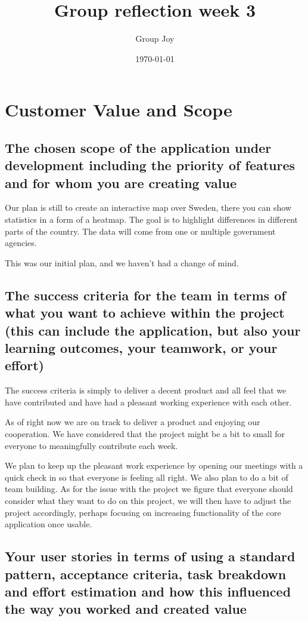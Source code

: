 \documentclass{scrartcl}
\begin{document}
\title{Group reflection week 3}
\author{Group Joy}
\date{\today}
\maketitle

\section{Customer Value and Scope}

\subsection{The chosen scope of the application under development including the priority of features and for whom you are creating value} 

Our plan is still to create an interactive map over Sweden, there you can show statistics in a form of a heatmap.
The goal is to highlight differences in different parts of the country.
The data will come from one or multiple government agencies.

This was our initial plan, and we haven't had a change of mind.

\subsection{The success criteria for the team in terms of what you want to achieve within the project (this can include the application, but also your learning outcomes, your teamwork, or your effort)}

The success criteria is simply to deliver a decent product and all feel that we have contributed and have had a pleasant working experience with each other. 

As of right now we are on track to deliver a product and enjoying our cooperation. We have considered that the project might be a bit to small for everyone to meaningfully contribute each week. 

We plan to keep up the pleasant work experience by opening our meetings with a quick check in so that everyone is feeling all right. We also plan to do a bit of team building. As for the issue with the project we figure that everyone should consider what they want to do on this project, we will then have to adjust the project accordingly, perhaps focusing on increasing functionality of the core application once usable.

\subsection{Your user stories in terms of using a standard pattern, acceptance criteria, task breakdown and effort estimation and how this influenced the way you worked and created value}
\end{document}
